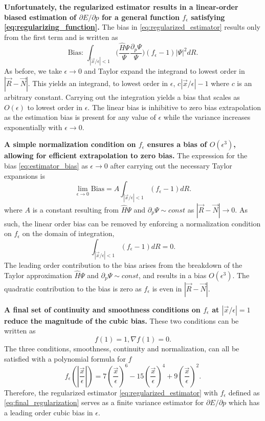 \documentclass{article}
\begin{document}
\textbf{Unfortunately, the regularized estimator results in a linear-order biased estimation of $\partial E/\partial p$ for a general function $f_\epsilon$ satisfying \eqref{eq:regularizing_function}.}
The bias in \eqref{eq:regularized_estimator} results only from the first term and is written as 
\begin{equation}
\text{Bias: } \int_{|\vec{x}/\epsilon|< 1} \Big(\frac{\hat{H}\Psi}{\Psi}\frac{\partial_p\Psi}{\Psi}\Big) (f_\epsilon - 1)|\Psi|^2 dR.
\label{eq:estimator_bias}
\end{equation}
As before, we take $\epsilon \rightarrow 0$ and Taylor expand the integrand to lowest order in $|\vec{R}-\vec{N}|$.
This yields an integrand, to lowest order in $\epsilon$, $c|\vec{x}/\epsilon| - 1$ where $c$ is an arbitrary constant.
Carrying out the integration yields a bias that scales as $O(\epsilon)$ to lowest order in $\epsilon$.
The linear bias is inhibitive to zero bias extrapolation as the estimation bias is present for any value of $\epsilon$ while the variance increases exponentially with $\epsilon \rightarrow 0$.

\textbf{A simple normalization condition on $f_\epsilon$ ensures a bias of $O(\epsilon^3)$, allowing for efficient extrapolation to zero bias.}
The expression for the bias \eqref{eq:estimator_bias} as $\epsilon \rightarrow 0$ after carrying out the necessary Taylor expansions is
$$
\lim_{\epsilon\rightarrow 0}\text{Bias} =  A \int_{|\vec{x}/\epsilon|< 1} (f_\epsilon - 1) dR.
$$
where $A$ is a constant resulting from $\hat{H}\Psi$ and $\partial_p \Psi \sim const$ as $|\vec{R}-\vec{N}|\rightarrow 0$.
As such, the linear order bias can be removed by enforcing a normalization condition on $f_\epsilon$ on the domain of integration, 
\begin{equation}
\int_{|\vec{x}/\epsilon|< 1} (f_\epsilon - 1) dR = 0.
\label{eq:normalization_condition}
\end{equation}
The leading order contribution to the bias arises from the breakdown of the Taylor approximation $\hat{H}\Psi$ and $\partial_p \Psi \sim const$, and results in a bias $O(\epsilon^3)$.
The quadratic contribution to the bias is zero as $f_\epsilon$ is even in $|\vec{R}-\vec{N}|$.

\textbf{A final set of continuity and smoothness conditions on $f_\epsilon$ at $|\vec{x}/\epsilon| = 1$ reduce the magnitude of the cubic bias.}
These two conditions can be written as 
\begin{equation}
f(1) = 1, \nabla f(1) = 0.
\label{eq:smoothness_condition}
\end{equation}
The three conditions, smoothness, continuity and normalization, can all be satisfied with a polynomial formula for $f$
\begin{equation}
f_\epsilon(|\frac{\vec{x}}{\epsilon}|) = 7(\frac{\vec{x}}{\epsilon})^6 - 15(\frac{\vec{x}}{\epsilon})^4 + 9(\frac{\vec{x}}{\epsilon})^2.
\label{eq:final_regularization}
\end{equation}
Therefore, the regularized estimator \eqref{eq:regularized_estimator} with $f_\epsilon$ defined as \eqref{eq:final_regularization} serves as a finite variance estimator for $\partial E/\partial p$ which has a leading order cubic bias in $\epsilon$.
\end{document}
